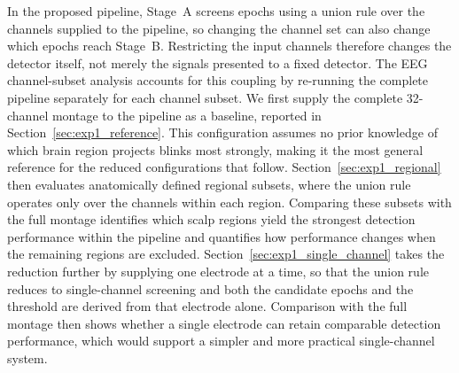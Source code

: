 
In the proposed pipeline, Stage~A screens epochs using a union rule over the channels supplied to the pipeline, so changing the channel set can also change which epochs reach Stage~B. Restricting the input channels therefore changes the detector itself, not merely the signals presented to a fixed detector. The EEG channel-subset analysis accounts for this coupling by re-running the complete pipeline separately for each channel subset. We first supply the complete 32-channel montage to the pipeline as a baseline, reported in Section~\ref{sec:exp1_reference}. This configuration assumes no prior knowledge of which brain region projects blinks most strongly, making it the most general reference for the reduced configurations that follow.
%
Section~\ref{sec:exp1_regional} then evaluates anatomically defined regional subsets, where the union rule operates only over the channels within each region. Comparing these subsets with the full montage identifies which scalp regions yield the strongest detection performance within the pipeline and quantifies how performance changes when the remaining regions are excluded.
%
Section~\ref{sec:exp1_single_channel} takes the reduction further by supplying one electrode at a time, so that the union rule reduces to single-channel screening and both the candidate epochs and the threshold are derived from that electrode alone. Comparison with the full montage then shows whether a single electrode can retain comparable detection performance, which would support a simpler and more practical single-channel system.
